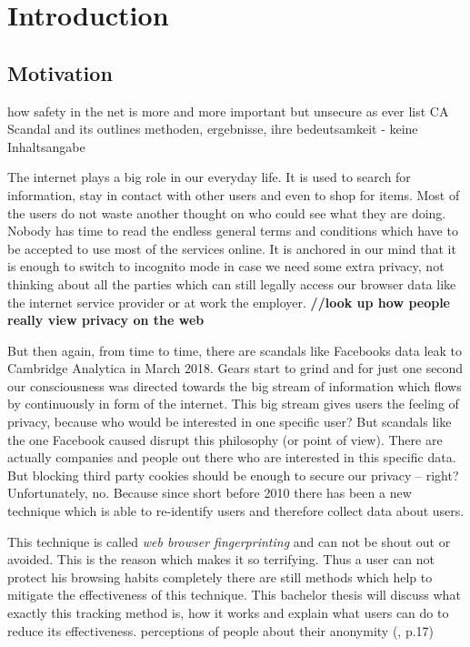 \chapter{Introduction}
\label{cha:Introduction}

\section{Motivation}

how safety in the net is more and more important
but unsecure as ever
list CA Scandal and its outlines
methoden, ergebnisse, ihre bedeutsamkeit - keine Inhaltsangabe


The internet plays a big role in our everyday life. It is used to search for information, stay in contact with other users and even to shop for items. Most of the users do not waste another thought on who could see what they are doing. Nobody has time to read the endless general terms and conditions which have to be accepted to use most of the services online. It is anchored in our mind that it is enough to switch to incognito mode in case we need some extra privacy, not thinking about all the parties which can still legally access our browser data like the internet service provider or at work the employer.
\textbf{//look up how people really view privacy on the web}

But then again, from time to time, there are scandals like Facebooks data leak to Cambridge Analytica in March 2018. Gears start to grind and for just one second our consciousness was directed towards the big stream of information which flows by continuously in form of the internet. This big stream gives users the feeling of privacy, because who would be interested in one specific user? But scandals like the one Facebook caused disrupt this philosophy (or point of view). There are actually companies and people out there who are interested in this specific data. But blocking third party cookies should be enough to secure our privacy – right? Unfortunately, no. Because since short before 2010 there has been a new technique which is able to re-identify users and therefore collect data about users. 

This technique is called \textit{web browser fingerprinting} and can not be shout out or avoided. This is the reason which makes it so terrifying. Thus a user can not protect his browsing habits completely there are still methods which help to mitigate the effectiveness of this technique.
This bachelor thesis will discuss what exactly this tracking method is, how it works and explain what users can do to reduce its effectiveness. 
perceptions of people about their anonymity
(\textcite{mayer09}, p.17)

